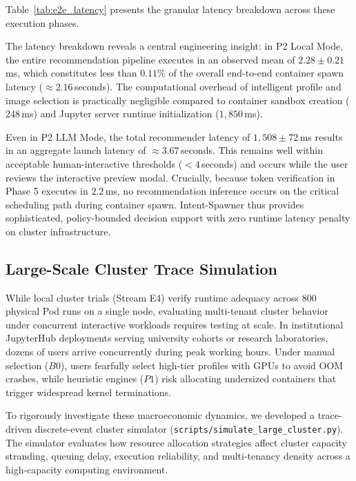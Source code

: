 Table~\ref{tab:e2e_latency} presents the granular latency breakdown across these execution phases.



The latency breakdown reveals a central engineering insight: in P2 Local Mode, the entire recommendation pipeline executes in an observed mean of $\mathbf{2.28 \pm 0.21}$\,ms, which constitutes less than $\mathbf{0.11\%}$ of the overall end-to-end container spawn latency ($\approx 2.16$\,seconds). The computational overhead of intelligent profile and image selection is practically negligible compared to container sandbox creation ($248$\,ms) and Jupyter server runtime initialization ($1,850$\,ms).

Even in P2 LLM Mode, the total recommender latency of $1,508 \pm 72$\,ms results in an aggregate launch latency of $\approx 3.67$\,seconds. This remains well within acceptable human-interactive thresholds ($<4$\,seconds) and occurs while the user reviews the interactive preview modal. Crucially, because token verification in Phase 5 executes in $2.2$\,ms, no recommendation inference occurs on the critical scheduling path during container spawn. Intent-Spawner thus provides sophisticated, policy-bounded decision support with zero runtime latency penalty on cluster infrastructure.

\subsection{Large-Scale Cluster Trace Simulation}
\label{subsec:large_scale_cluster_simulation}

While local cluster trials (Stream E4) verify runtime adequacy across 800 physical Pod runs on a single node, evaluating multi-tenant cluster behavior under concurrent interactive workloads requires testing at scale. In institutional JupyterHub deployments serving university cohorts or research laboratories, dozens of users arrive concurrently during peak working hours. Under manual selection ($B0$), users fearfully select high-tier profiles with GPUs to avoid OOM crashes, while heuristic engines ($P1$) risk allocating undersized containers that trigger widespread kernel terminations.

To rigorously investigate these macroeconomic dynamics, we developed a trace-driven discrete-event cluster simulator (\texttt{scripts/simulate\_large\_cluster.py}). The simulator evaluates how resource allocation strategies affect cluster capacity stranding, queuing delay, execution reliability, and multi-tenancy density across a high-capacity computing environment.

